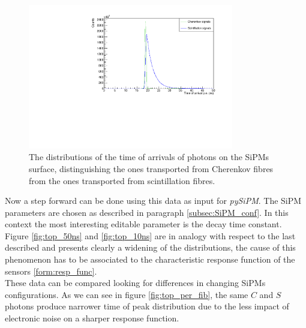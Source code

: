 \begin{figure}
	\centering
	\includegraphics[width=0.8\textwidth]{IMG/Cap5/TrueTimeDist20GeV}
	\caption{The distributions of the time of arrivals of photons on the SiPMs surface, distinguishing the ones transported from Cherenkov fibres from the ones transported from scintillation fibres.}
	\label{fig:true_toa_dist}
\end{figure}

Now a step forward can be done using this data as input for \textit{pySiPM}. The SiPM parameters are chosen as described in paragraph \ref{subsec:SiPM_conf}. In this context the most interesting editable parameter is the decay time constant.\\ 
Figure \ref{fig:top_50ns} and \ref{fig:top_10ns} are in analogy with respect to the last described and presents clearly a widening of the distributions, the cause of this phenomenon has to be associated to the characteristic response function of the sensors \ref{form:resp_func}.\\
These data can be compared looking for differences in changing SiPMs configurations. As we can see in figure \ref{fig:top_per_fib}, the same $C$ and $S$ photons produce narrower time of peak distribution due to the less impact of electronic noise on a sharper response function.\\

